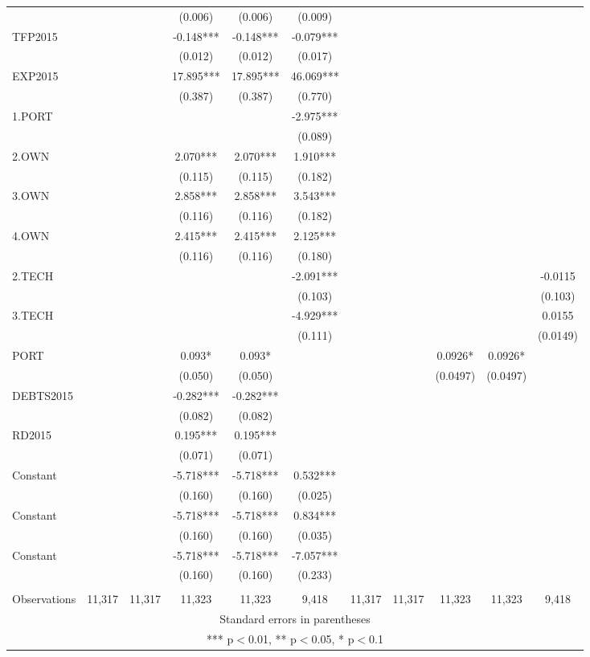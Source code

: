 \documentclass[]{article}
\begin{document}
\begin{tabular}{lcccccccccc}
 &  &  & (0.006) & (0.006) & (0.009) &  &  &  &  &  \\
TFP2015 &  &  & -0.148*** & -0.148*** & -0.079*** &  &  &  &  &  \\
 &  &  & (0.012) & (0.012) & (0.017) &  &  &  &  &  \\
EXP2015 &  &  & 17.895*** & 17.895*** & 46.069*** &  &  &  &  &  \\
 &  &  & (0.387) & (0.387) & (0.770) &  &  &  &  &  \\
1.PORT &  &  &  &  & -2.975*** &  &  &  &  &  \\
 &  &  &  &  & (0.089) &  &  &  &  &  \\
2.OWN &  &  & 2.070*** & 2.070*** & 1.910*** &  &  &  &  &  \\
 &  &  & (0.115) & (0.115) & (0.182) &  &  &  &  &  \\
3.OWN &  &  & 2.858*** & 2.858*** & 3.543*** &  &  &  &  &  \\
 &  &  & (0.116) & (0.116) & (0.182) &  &  &  &  &  \\
4.OWN &  &  & 2.415*** & 2.415*** & 2.125*** &  &  &  &  &  \\
 &  &  & (0.116) & (0.116) & (0.180) &  &  &  &  &  \\
2.TECH &  &  &  &  & -2.091*** &  &  &  &  & -0.0115 \\
 &  &  &  &  & (0.103) &  &  &  &  & (0.103) \\
3.TECH &  &  &  &  & -4.929*** &  &  &  &  & 0.0155 \\
 &  &  &  &  & (0.111) &  &  &  &  & (0.0149) \\
PORT &  &  & 0.093* & 0.093* &  &  &  & 0.0926* & 0.0926* &  \\
 &  &  & (0.050) & (0.050) &  &  &  & (0.0497) & (0.0497) &  \\
DEBTS2015 &  &  & -0.282*** & -0.282*** &  &  &  &  &  &  \\
 &  &  & (0.082) & (0.082) &  &  &  &  &  &  \\
RD2015 &  &  & 0.195*** & 0.195*** &  &  &  &  &  &  \\
 &  &  & (0.071) & (0.071) &  &  &  &  &  &  \\
Constant &  &  & -5.718*** & -5.718*** & 0.532*** &  &  &  &  &  \\
 &  &  & (0.160) & (0.160) & (0.025) &  &  &  &  &  \\
Constant &  &  & -5.718*** & -5.718*** & 0.834*** &  &  &  &  &  \\
 &  &  & (0.160) & (0.160) & (0.035) &  &  &  &  &  \\
Constant &  &  & -5.718*** & -5.718*** & -7.057*** &  &  &  &  &  \\
 &  &  & (0.160) & (0.160) & (0.233) &  &  &  &  &  \\
 &  &  &  &  &  &  &  &  &  &  \\
 Observations & 11,317 & 11,317 & 11,323 & 11,323 & 9,418 & 11,317 & 11,317 & 11,323 & 11,323 & 9,418 \\ \hline
\multicolumn{11}{c}{ Standard errors in parentheses} \\
\multicolumn{11}{c}{ *** p$<$0.01, ** p$<$0.05, * p$<$0.1} \\
\end{tabular}
\end{document}

